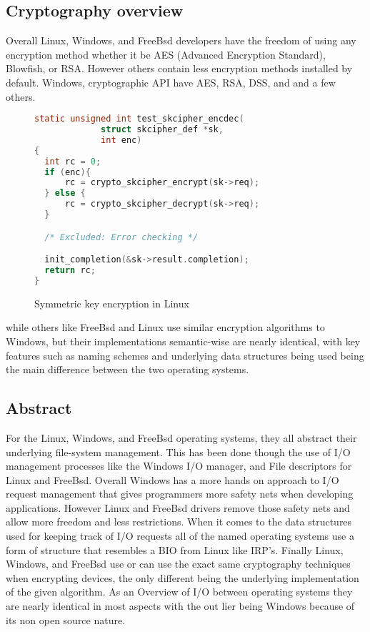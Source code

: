 \subsection{Cryptography overview}
Overall Linux, Windows, and FreeBsd developers have the freedom of using any encryption method whether it be AES (Advanced Encryption Standard), Blowfish, or RSA. However others contain less encryption methods installed by default. Windows, cryptographic API have AES, RSA, DSS, and and a few others\cite{Cryptogr64:online}.
\begin{figure}[h]
\begin{lstlisting}[language=C, style=customc]
static unsigned int test_skcipher_encdec(
             struct skcipher_def *sk,
             int enc)
{
  int rc = 0;
  if (enc){
      rc = crypto_skcipher_encrypt(sk->req);  
  } else {
      rc = crypto_skcipher_decrypt(sk->req);
  }

  /* Excluded: Error checking */

  init_completion(&sk->result.completion);
  return rc;
}
\end{lstlisting}
\caption{ Symmetric key encryption in Linux\cite{LinuxKer69:online}}
\end{figure}

while others like FreeBsd and Linux use similar encryption algorithms to Windows, but their implementations semantic-wise are nearly identical, with key features such as naming schemes and underlying data structures being used being the main difference between the two operating systems.
\subsection{Abstract}
For the Linux, Windows, and FreeBsd operating systems, they all abstract their underlying file-system management. This has been done though the use of I/O management processes like the Windows I/O manager, and File descriptors for Linux and FreeBsd. Overall Windows has a more hands on approach to I/O request management that gives programmers more safety nets when developing applications. However Linux and FreeBsd drivers remove those safety nets and allow more freedom and less restrictions. When it comes to the data structures used for keeping track of I/O requests all of the named operating systems use a form of structure that resembles a BIO from Linux like IRP's. Finally Linux, Windows, and FreeBsd use or can use the exact same cryptography techniques when encrypting devices, the only different being the underlying implementation of the given algorithm. As an Overview of I/O between operating systems  they are nearly identical in most aspects with the out lier being Windows because of its non open source nature.  
